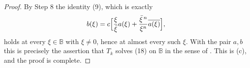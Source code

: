 \begin{proof}
By Step 8 the identity (9), which is exactly
\[
  b(\xi)=c\Bigl[\frac{\xi}{\bar\xi}a(\xi)
    +\frac{\bar\xi^{\,n}}{\xi^{n}}\overline{a(\xi)}\Bigr],
\]
holds at every $\xi\in\mathbb{B}$ with $\xi\neq0$, hence at almost every such
$\xi$.  With the pair $a,b$ this is precisely the assertion that $T_k$ solves
(18) on $\mathbb{B}$ in the sense of .  This is (c), and
the proof is complete.
\end{proof}
